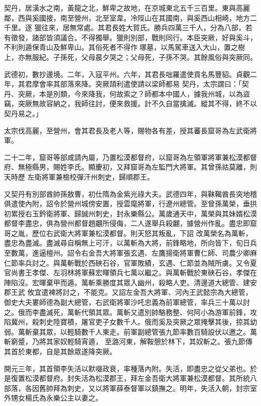 \begin{pinyinscope}
 契丹，居潢水之南，黃龍之北，鮮卑之故地，在京城東北五千三百里。東與高麗鄰，西與奚國接，南至營州，北至室韋。冷陘山在其國南，與奚西山相崎，地方二千里。逐
 獵往來，居無常處。其君長姓大賀氏。勝兵四萬三千人，分為八部，若有徵發，諸部皆須議合。不得獨舉。獵則別部，戰則同行。本臣突厥，好與奚斗，不利則遁保青山及鮮卑山。其俗死者不得作塚墓，以馬駕車送入大山，置之樹上，亦無服紀。子孫死，父母晨夕哭之；父母死，子孫不哭。其餘風俗與突厥同。



 武德初，數抄邊境。二年，入寇平州。六年，其君長咄羅遣使貢名馬豐貂。貞觀二年，其君摩會率其部落來降。突厥頡利遣使請以梁師都易
 契丹，太宗謂曰：「契丹、突厥，本是別類，今來降我，何故索之？師都本中國人，據我州城，以為盜竊，突厥無故容納之，我師往討，便來救援。計不久自當擒滅。縱其不得，終不以契丹易之。」



 太宗伐高麗，至營州，會其君長及老人等，賜物各有差，授其蕃長窟哥為左武衛將軍。



 二十二年，窟哥等部咸請內屬，乃置松漠都督府，以窟哥為左領軍將軍兼松漠都督府、無極縣男，賜姓李氏。顯慶初，又拜窟哥為左監門大將軍。其曾孫祜莫離，則天時歷
 左衛將軍兼檢校彈汗州刺史，歸順郡王。



 又契丹有別部酋帥孫敖曹，初仕隋為金紫光祿大夫。武德四年，與靺鞨酋長突地稽俱遣使內附，詔令於營州城傍安置，授雲麾將軍，行遼州總管。至曾孫萬榮，垂拱初累授右玉鈐衛將軍、歸誠州刺史，封永樂縣公。萬歲通天中，萬榮與其妹婿松漠都督李盡忠，俱為營州都督趙翽所侵侮，二人遂舉兵殺翽，據營州作亂。盡忠即窟哥之胤，歷位右武衛大將軍兼松漠都督。則天怒其叛亂，下詔
 改萬榮名為萬斬，盡忠為盡滅。盡滅尋自稱無上可汗，以萬斬為大將，前鋒略地，所向皆下，旬日兵至數萬，進逼檀州。詔令右金吾大將軍張玄遇、左鷹揚衛將軍曹仁師、司農少卿麻仁節率兵討之。與萬斬戰於西硤石谷，官軍敗績，玄遇、仁節並為賊所虜。又令夏官尚書王孝傑、左羽林將軍蘇宏暉領兵七萬以繼之。與萬斬戰於東硤石谷，孝傑在陣陷沒。宏暉棄甲而遁。萬斬乘勝度其眾入幽州，殺略人吏。清邊道大總管、建安郡王武
 攸宜遣裨將討之，不能克。又詔左金吾大將軍、河內王武懿宗為大總管，御史大夫婁師德為副大總管，右武衛將軍沙吒忠義為前軍總管，率兵三十萬以討之。俄而李盡滅死，萬斬代領其眾。萬斬又遣別帥駱務整、何阿小為游軍前鋒，攻陷冀州，殺刺史陸寶積，屠官吏子女數千人。俄而奚及突厥之眾掩擊其後，掠其幼弱。萬斬棄其眾，以輕騎數千人東走。前軍副總管張九節率數百騎設伏以邀之。萬斬窮蹙，乃將其家奴輕騎宵遁，
 至潞河東，解鞍憩於林下，其奴斬之。張九節傳其首於東都，自是其餘眾遂降突厥。



 開元三年，其首領李失活以默啜政衰，率種落內附。失活，即盡忠之從父弟也。於是復置松漠都督府。封失活為松漠郡王，拜左金吾衛大將軍兼松漠都督。其所統八部落，各因舊帥拜為刺史，又以將軍薛泰督軍以鎮撫之。明年，失活入朝，封宗室外甥女楊氏為永樂公主以妻之。




\end{pinyinscope}
